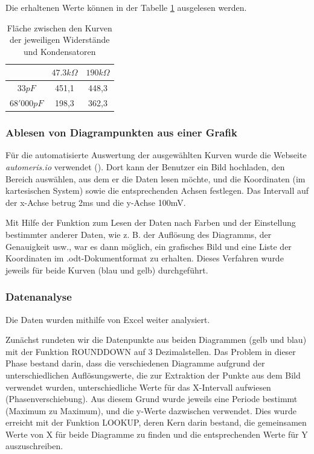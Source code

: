 \documentclass{article}
\begin{document}
Die erhaltenen Werte können in der Tabelle \ref{tab:integrals} ausgelesen werden.

\begin{table}[ht]
    \centering
    \begin{tabular}{ c|c c }
                    & $47.3k\Omega$ & $190k\Omega$ \\
        \hline
        $33pF$      & 451,1 & 448,3 \\
        $68'000pF$  & 198,3 & 362,3
    \end{tabular}
    \caption{Fläche zwischen den Kurven der jeweiligen Widerstände und Kondensatoren}
    \label{tab:integrals}
\end{table}

\subsubsection{Ablesen von Diagrampunkten aus einer Grafik}

Für die automatisierte Auswertung der ausgewählten Kurven wurde die Webseite \emph{automeris.io} verwendet (\cite{automeris_webplotdigitizer_webpage}). Dort kann der Benutzer ein Bild hochladen, den Bereich auswählen, aus dem er die Daten lesen möchte, und die Koordinaten (im kartesischen System) sowie die entsprechenden Achsen festlegen. 
Das Intervall auf der x-Achse betrug 2ms und die y-Achse 100mV.

Mit Hilfe der Funktion zum Lesen der Daten nach Farben und der Einstellung bestimmter anderer Daten, wie z. B. der Auflösung des Diagramms, der Genauigkeit usw., war es dann möglich, ein grafisches Bild und eine Liste der Koordinaten im .odt-Dokumentformat zu erhalten.
Dieses Verfahren wurde jeweils für beide Kurven (blau und gelb) durchgeführt.

\subsubsection{Datenanalyse} 

Die Daten wurden mithilfe von Excel weiter analysiert.

Zunächst rundeten wir die Datenpunkte aus beiden Diagrammen (gelb und blau) mit der Funktion ROUNDDOWN auf 3 Dezimalstellen.
Das Problem in dieser Phase bestand darin, dass die verschiedenen Diagramme aufgrund der unterschiedlichen Auflösungswerte, die zur Extraktion der Punkte aus dem Bild verwendet wurden, unterschiedliche Werte für das X-Intervall aufwiesen (Phasenverschiebung). Aus diesem Grund wurde jeweils eine Periode bestimmt (Maximum zu Maximum), und die y-Werte dazwischen verwendet. Dies wurde erreicht mit der Funktion LOOKUP, deren Kern darin bestand, die gemeinsamen Werte von X für beide Diagramme zu finden und die entsprechenden Werte für Y auszuschreiben.
\end{document}
